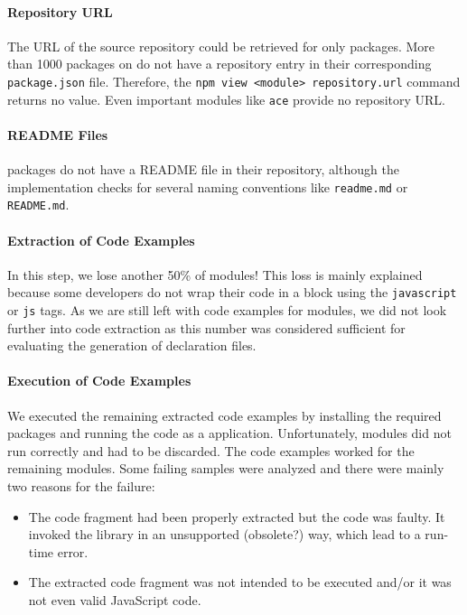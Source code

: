 \documentclass[sigconf]{acmart}
\begin{document}
\paragraph*{Repository URL}
The URL of the source repository could be retrieved for only \CountModulesWithRepositoryUrl{}
packages. More than 1000 packages on \NPM{} do not have a repository
entry in their corresponding \texttt{package.json} file. Therefore, the
\texttt{npm view <module> repository.url} command returns no
value. Even important modules like \texttt{ace} provide no repository URL.

\paragraph*{README Files}
\CountModulesWithoutReadmeFile{} packages do not have a README file in their repository, although
the implementation checks for several naming conventions like
\texttt{readme.md} or \texttt{README.md}. 

\paragraph*{Extraction of Code Examples}
In this step, we lose another 50\% of modules! This loss is mainly
explained because some developers do not wrap their code in a block
using the \texttt{javascript} or \texttt{js} tags. As we are
still left with code examples for \CountModulesWithCodeExamples{} modules, we did not look
further into code extraction as this number was considered sufficient for
evaluating the generation of declaration files. 

\paragraph*{Execution of Code Examples}
We executed the remaining \CountModulesWithCodeExamples{} extracted code examples by installing the
required packages and running the code as a \NodeJS{}
application. Unfortunately,
\CountModulesNotWorkingCodeExamples{} modules did not run correctly and had to be
discarded.
The code examples worked for the remaining \CountModulesWorkingCodeExamples{}
modules.
Some failing samples were analyzed and there were mainly
two reasons for the failure: 
\begin{itemize}
\item The code fragment had been properly extracted but the code was
  faulty. It invoked the library in an unsupported
  (obsolete?) way, which lead to a run-time error.
\item The extracted code fragment was not intended to be executed
  and/or it was not even valid JavaScript code. 
\end{itemize}
\end{document}
